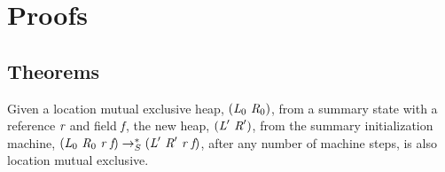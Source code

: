 \section{Proofs}



\subsection{Theorems}
\begin{lemma}
Given a location mutual exclusive heap, $(\emph{L}_0\ \emph{R}_0)$, from a
summary state with a reference $\emph{r}$ and field $\emph{f}$, the
new heap, $(\emph{L}^\prime\ \emph{R}^\prime)$, from the summary
initialization machine, $(\emph{L}_0\ \emph{R}_0\ \emph{r}\ \emph{f})
\rightarrow^*_S
(\emph{L}^\prime\ \emph{R}^\prime\ \emph{r}\ \emph{f})$, after any number of machine steps, is also
location mutual exclusive.
\end{lemma}
